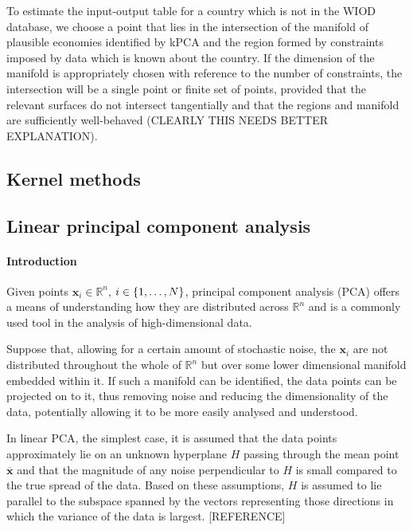 \documentclass[preprint,authoryear,3p]{elsarticle}
\begin{document}
To estimate the input-output table for a country which is not in the WIOD database, we choose a point that lies in the intersection of the manifold of plausible economies identified by kPCA and the region formed by constraints imposed by data which is known about the country. If the dimension of the manifold is appropriately chosen with reference to the number of constraints, the intersection will be a single point or finite set of points, provided that the relevant surfaces do not intersect tangentially and that the regions and manifold are sufficiently well-behaved (CLEARLY THIS NEEDS BETTER EXPLANATION).




\subsection{Kernel methods}




\subsection{Linear principal component analysis}



\paragraph*{Introduction}

Given points $\textbf{x}_i \in \mathbb{R}^n$, $i \in \{ 1, \mathellipsis, N \}$, principal component analysis (PCA) offers a means of understanding how they are distributed across $\mathbb{R}^n$ and is a commonly used tool in the analysis of high-dimensional data.

Suppose that, allowing for a certain amount of stochastic noise, the $\textbf{x}_i$ are not distributed throughout the whole of $\mathbb{R}^n$ but over some lower dimensional manifold embedded within it. If such a manifold can be identified, the data points can be projected on to it, thus removing noise and reducing the dimensionality of the data, potentially allowing it to be more easily analysed and understood.

In linear PCA, the simplest case, it is assumed that the data points approximately lie on an unknown hyperplane $H$ passing through the mean point $\overline{\textbf{x}}$ and that the magnitude of any noise perpendicular to $H$ is small compared to the true spread of the data. Based on these assumptions, $H$ is assumed to lie parallel to the subspace spanned by the vectors representing those directions in which the variance of the data is largest. [REFERENCE]
\end{document}
